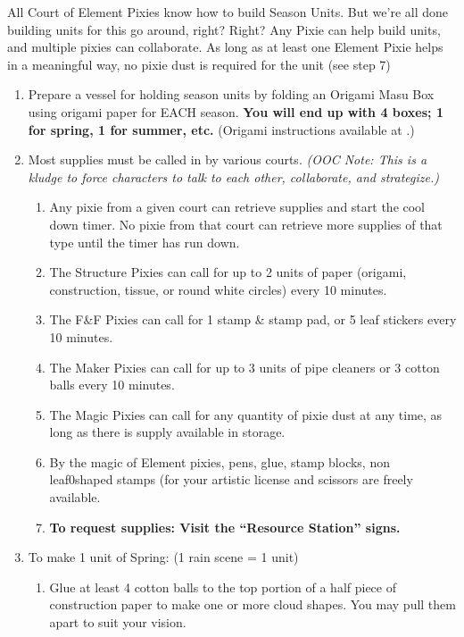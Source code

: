 \documentclass[green]{PP}
\begin{document}
\name{\gSesons{}}

All Court of Element Pixies know how to build Season Units. But we’re all done building units for this go around, right? Right? Any Pixie can help build units, and multiple pixies can collaborate. As long as at least one Element Pixie helps in a meaningful way, no pixie dust is required for the unit (see step 7)

\begin{enumerate}
	\item Prepare a vessel for holding season units by folding an Origami Masu Box using origami paper for EACH season. \textbf{You will end up with 4 boxes; 1 for spring, 1 for summer, etc.} (Origami instructions available at \sResourceElements{}.)
	\item Most supplies must be called in by various courts. \textit{(OOC Note: This is a kludge to force characters to talk to each other, collaborate, and strategize.)}
	\begin{enumerate}
		\item Any pixie from a given court can retrieve supplies and start the cool down timer. No pixie from that court can retrieve more supplies of that type until the timer has run down.
		\item The Structure Pixies can call for up to 2 units of paper (origami, construction, tissue, or round white circles) every 10 minutes.
		\item The F\&F Pixies can call for 1 stamp \& stamp pad, or 5 leaf stickers every 10 minutes.
		\item The Maker Pixies can call for up to 3 units of pipe cleaners or 3 cotton balls every 10 minutes.
		\item The Magic Pixies can call for any quantity of pixie dust at any time, as long as there is supply available in storage.
		\item By the magic of Element pixies, pens, glue, stamp blocks, non leaf0shaped stamps (for your artistic license and scissors are freely available.
		\item \textbf{To request supplies: Visit the ``Resource Station'' signs.}
	\end{enumerate}
	\item To make 1 unit of Spring: (1 rain scene = 1 unit)
	\begin{enumerate}
		\item Glue at least 4 cotton balls to the top portion of a half piece of construction paper to make one or more cloud shapes. You may pull them apart to suit your vision.

\end{enumerate}
\end{enumerate}
\end{document}
